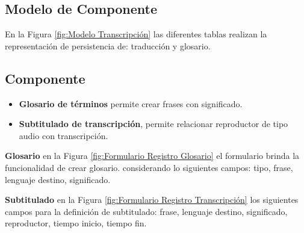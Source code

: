 \begin{minipage}{1.0\textwidth}
	\centering
	\label{fig:Diagrama Secuencia Traducción}
\end{minipage}

\subsection{Modelo de Componente}

En la Figura \ref{fig:Modelo Transcripción} las diferentes tablas realizan
la representación de persistencia de: traducción y glosario.

\begin{minipage}{1.0\textwidth}
	\centering
	\label{fig:Modelo Transcripción}
\end{minipage}

\subsection{Componente}

\begin{itemize}

\item \textbf{Glosario de términos} permite crear frases con significado.
\item \textbf{Subtitulado de transcripción}, permite relacionar reproductor
de tipo audio con transcripción.

\end{itemize}

\textbf{Glosario} en la Figura \ref{fig:Formulario Registro Glosario} el
formulario brinda la funcionalidad de crear glosario. considerando lo
siguientes campos: tipo, frase, lenguaje destino, significado.

\begin{minipage}{1.0\textwidth}
	\centering
	\label{fig:Formulario Registro Glosario}
\end{minipage}

\textbf{Subtitulado} en la Figura \ref{fig:Formulario Registro Transcripción}
los siguientes campos para la definición de subtitulado: frase, lenguaje
destino, significado, reproductor, tiempo inicio, tiempo fin.

